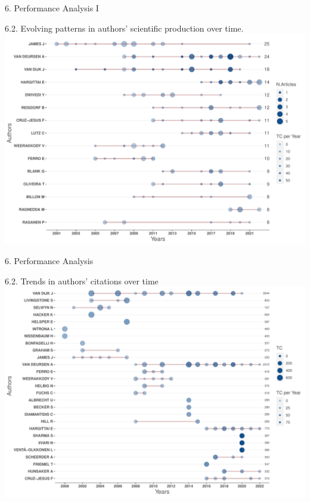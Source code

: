 \documentclass[
  ignorenonframetext,
]{beamer}
\begin{document}
\begin{frame}{6. Performance Analysis I}
\protect\hypertarget{performance-analysis-i-1}{}
\vspace{0.5cm}

\begin{block}{6.2. Evolving patterns in authors' scientific production
over time.}
\protect\hypertarget{evolving-patterns-in-authors-scientific-production-over-time.}{}
\includegraphics{Presentation_bibliometric_files/figure-beamer/Prod of AU-1.pdf}
\end{block}
\end{frame}

\begin{frame}{6. Performance Analysis}
\protect\hypertarget{performance-analysis}{}
\begin{block}{6.2. Trends in authors' citations over time}
\protect\hypertarget{trends-in-authors-citations-over-time}{}
\includegraphics{Presentation_bibliometric_files/figure-beamer/Influence of AU chart-1.pdf}
\end{block}
\end{frame}
\end{document}
